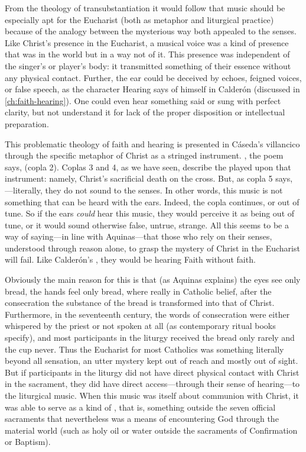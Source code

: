 From the theology of transubstantiation it would follow that music should be
especially apt for the Eucharist (both as metaphor and liturgical practice)
because of the analogy between the mysterious way both appealed to the senses.
Like Christ's presence in the Eucharist, a musical voice was a kind of presence
that was in the world but in a way not of it. 
This presence was independent of the singer's or player's body: it transmitted
something of their essence without any physical contact.
Further, the ear could be deceived by echoes, feigned voices, or false speech,
as the character Hearing says of himself in Calderón  (discussed in \cref{ch:faith-hearing}).
One could even hear something said or sung with perfect clarity, but not
understand it for lack of the proper disposition or intellectual preparation.

This problematic theology of faith and hearing is presented in Cáseda's
villancico through the specific metaphor of Christ as a stringed instrument.
, the poem says,  (copla 2).
Coplas 3 and 4, as we have seen, describe the  played upon that
instrument: namely, Christ's sacrificial death on the cross.
But, as copla 5 says, ---literally, they do not sound to the
senses. 
In other words, this music is not something that can be heard with the ears.
Indeed, the copla continues,  or out of tune.
So if the ears \emph{could} hear this music, they would perceive it as being
out of tune, or it would sound otherwise false, untrue, strange. 
All this seems to be a way of saying---in line with Aquinas---that those who
rely on their senses, understood through reason alone, to grasp the mystery of
Christ in the Eucharist will fail.
Like Calderón's , they would be hearing Faith without faith.

Obviously the main reason for this is that (as Aquinas explains) the eyes see
only bread, the hands feel only bread, where really in Catholic belief, after
the consecration the substance of the bread is transformed into that of Christ.
Furthermore, in the seventeenth century, the words of consecration were either
whispered by the priest or not spoken at all (as contemporary ritual books
specify), and most participants in the liturgy received the bread only rarely
and the cup never.
Thus the Eucharist for most Catholics was something literally beyond all
sensation, an utter mystery kept out of reach and mostly out of sight.
But if participants in the liturgy did not have direct physical contact with
Christ in the sacrament, they did have direct access---through their sense of
hearing---to the liturgical music.
When this music was itself about communion with Christ, it was able to serve as
a kind of , that is, something outside the seven official
sacraments that nevertheless was a means of encountering God through the
material world (such as holy oil or water outside the sacraments of
Confirmation or Baptism).

